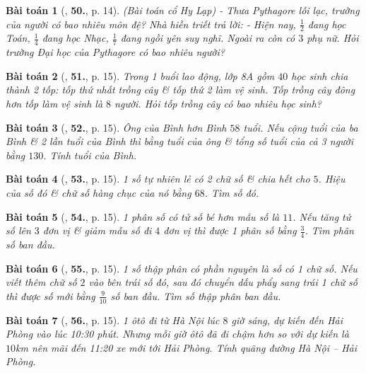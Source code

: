 \documentclass{article}
\numberwithin{equation}{section}
\newtheorem{baitoan}{Bài toán}
\begin{document}
\begin{baitoan}[\cite{SBT_Toan_8_tap_2}, \textbf{50.}, p. 14]
	\emph{(Bài toán cổ Hy Lạp)} - Thưa Pythagore lỗi lạc, trường của người có bao nhiêu môn đệ? Nhà hiền triết trả lời: - Hiện nay, $\frac{1}{2}$ đang học Toán, $\frac{1}{4}$ đang học Nhạc, $\frac{1}{7}$ đang ngồi yên suy nghĩ. Ngoài ra còn có $3$ phụ nữ. Hỏi trường Đại học của Pythagore có bao nhiêu người?
\end{baitoan}

\begin{baitoan}[\cite{SBT_Toan_8_tap_2}, \textbf{51.}, p. 15]
	Trong 1 buổi lao động, lớp 8A gồm $40$ học sinh chia thành 2 tốp: tốp thứ nhất trồng cây \& tốp thứ 2 làm vệ sinh. Tốp trồng cây đông hơn tốp làm vệ sinh là $8$ người. Hỏi tốp trồng cây có bao nhiêu học sinh?	
\end{baitoan}

\begin{baitoan}[\cite{SBT_Toan_8_tap_2}, \textbf{52.}, p. 15]
	Ông của Bình hơn Bình $58$ tuổi. Nếu cộng tuổi của ba Bình \& 2 lần tuổi của Bình thì bằng tuổi của ông \& tổng số tuổi của cả 3 người bằng $130$. Tính tuổi của Bình.	
\end{baitoan}

\begin{baitoan}[\cite{SBT_Toan_8_tap_2}, \textbf{53.}, p. 15]
	1 số tự nhiên lẻ có 2 chữ số \& chia hết cho $5$. Hiệu của số đó \& chữ số hàng chục của nó bằng $68$. Tìm số đó.
\end{baitoan}

\begin{baitoan}[\cite{SBT_Toan_8_tap_2}, \textbf{54.}, p. 15]
	1 phân số có tử số bé hơn mẫu số là $11$. Nếu tăng tử số lên $3$ đơn vị \& giảm mẫu số đi $4$ đơn vị thì được 1 phân số bằng $\frac{3}{4}$. Tìm phân số ban đầu.
\end{baitoan}

\begin{baitoan}[\cite{SBT_Toan_8_tap_2}, \textbf{55.}, p. 15]
	1 số thập phân có phần nguyên là số có 1 chữ số. Nếu viết thêm chữ số $2$ vào bên trái số đó, sau đó chuyển dấu phẩy sang trái 1 chữ số thì được số mới bằng $\frac{9}{10}$ số ban đầu. Tìm số thập phân ban đầu.
\end{baitoan}

\begin{baitoan}[\cite{SBT_Toan_8_tap_2}, \textbf{56.}, p. 15]
	1 ôtô đi từ Hà Nội lúc $8$ giờ sáng, dự kiến đến Hải Phòng vào lúc 10:30 phút. Nhưng mỗi giờ ôtô đã đi chậm hơn so với dự kiến là $10$\emph{km} nên mãi đến 11:20 xe mới tới Hải Phòng. Tính quãng đường Hà Nội -- Hải Phòng.
\end{baitoan}
\end{document}
